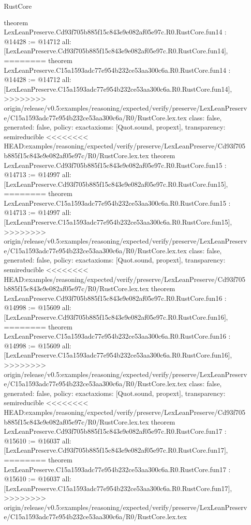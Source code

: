 \begin{lexlean}{RustCore}
\begin{coremodule}
{\begin{coremodule}
{{{{{{{{{{{{{{{{theorem LexLeanPreserve.Cd93f705b885f15c843e9e082af05e97c.R0.RustCore.fun14 : @14428 := @14712 {
  all: [LexLeanPreserve.Cd93f705b885f15c843e9e082af05e97c.R0.RustCore.fun14],
========
theorem LexLeanPreserve.C15a1593adc77e954b232ce53aa300c6a.R0.RustCore.fun14 : @14428 := @14712 {
  all: [LexLeanPreserve.C15a1593adc77e954b232ce53aa300c6a.R0.RustCore.fun14],
>>>>>>>> origin/release/v0.5:examples/reasoning/expected/verify/preserve/LexLeanPreserve/C15a1593adc77e954b232ce53aa300c6a/R0/RustCore.lex.tex
  class: false,
  generated: false,
  policy: exact{axioms: [Quot.sound, propext]},
  transparency: semireducible
}
<<<<<<<< HEAD:examples/reasoning/expected/verify/preserve/LexLeanPreserve/Cd93f705b885f15c843e9e082af05e97c/R0/RustCore.lex.tex
theorem LexLeanPreserve.Cd93f705b885f15c843e9e082af05e97c.R0.RustCore.fun15 : @14713 := @14997 {
  all: [LexLeanPreserve.Cd93f705b885f15c843e9e082af05e97c.R0.RustCore.fun15],
========
theorem LexLeanPreserve.C15a1593adc77e954b232ce53aa300c6a.R0.RustCore.fun15 : @14713 := @14997 {
  all: [LexLeanPreserve.C15a1593adc77e954b232ce53aa300c6a.R0.RustCore.fun15],
>>>>>>>> origin/release/v0.5:examples/reasoning/expected/verify/preserve/LexLeanPreserve/C15a1593adc77e954b232ce53aa300c6a/R0/RustCore.lex.tex
  class: false,
  generated: false,
  policy: exact{axioms: [Quot.sound, propext]},
  transparency: semireducible
}
<<<<<<<< HEAD:examples/reasoning/expected/verify/preserve/LexLeanPreserve/Cd93f705b885f15c843e9e082af05e97c/R0/RustCore.lex.tex
theorem LexLeanPreserve.Cd93f705b885f15c843e9e082af05e97c.R0.RustCore.fun16 : @14998 := @15609 {
  all: [LexLeanPreserve.Cd93f705b885f15c843e9e082af05e97c.R0.RustCore.fun16],
========
theorem LexLeanPreserve.C15a1593adc77e954b232ce53aa300c6a.R0.RustCore.fun16 : @14998 := @15609 {
  all: [LexLeanPreserve.C15a1593adc77e954b232ce53aa300c6a.R0.RustCore.fun16],
>>>>>>>> origin/release/v0.5:examples/reasoning/expected/verify/preserve/LexLeanPreserve/C15a1593adc77e954b232ce53aa300c6a/R0/RustCore.lex.tex
  class: false,
  generated: false,
  policy: exact{axioms: [Quot.sound, propext]},
  transparency: semireducible
}
<<<<<<<< HEAD:examples/reasoning/expected/verify/preserve/LexLeanPreserve/Cd93f705b885f15c843e9e082af05e97c/R0/RustCore.lex.tex
theorem LexLeanPreserve.Cd93f705b885f15c843e9e082af05e97c.R0.RustCore.fun17 : @15610 := @16037 {
  all: [LexLeanPreserve.Cd93f705b885f15c843e9e082af05e97c.R0.RustCore.fun17],
========
theorem LexLeanPreserve.C15a1593adc77e954b232ce53aa300c6a.R0.RustCore.fun17 : @15610 := @16037 {
  all: [LexLeanPreserve.C15a1593adc77e954b232ce53aa300c6a.R0.RustCore.fun17],
>>>>>>>> origin/release/v0.5:examples/reasoning/expected/verify/preserve/LexLeanPreserve/C15a1593adc77e954b232ce53aa300c6a/R0/RustCore.lex.tex
}}}}}}}}}}}}}}}}}}}}}
\end{coremodule}}
\end{coremodule}
\end{lexlean}

